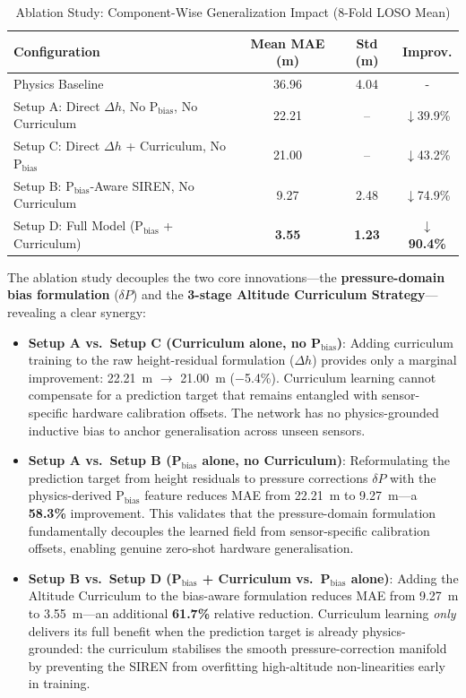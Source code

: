 \begin{table}[htbp]
\caption{Ablation Study: Component-Wise Generalization Impact (8-Fold LOSO Mean)}
\label{tab:ablation}
\centering
\begin{tabular}{lccc}
\toprule
\textbf{Configuration} & \textbf{Mean MAE (m)} & \textbf{Std (m)} & \textbf{Improv.} \\
\midrule
Physics Baseline & 36.96 & 4.04 & - \\
\midrule
Setup A: Direct $\Delta h$, No P$_{\text{bias}}$, No Curriculum & 22.21 & -- & $\downarrow$39.9\% \\
Setup C: Direct $\Delta h$ + Curriculum, No P$_{\text{bias}}$ & 21.00 & -- & $\downarrow$43.2\% \\
Setup B: P$_{\text{bias}}$-Aware SIREN, No Curriculum & 9.27 & 2.48 & $\downarrow$74.9\% \\
\midrule
Setup D: Full Model (P$_{\text{bias}}$ + Curriculum) & \textbf{3.55} & \textbf{1.23} & $\boldsymbol{\downarrow}$\textbf{90.4\%} \\
\bottomrule
\end{tabular}
\end{table}

The ablation study decouples the two core innovations---the \textbf{pressure-domain bias formulation} ($\delta P$) and the \textbf{3-stage Altitude Curriculum Strategy}---revealing a clear synergy:

\begin{itemize}
    \item \textbf{Setup A vs.\ Setup C (Curriculum alone, no P$_{\text{bias}}$)}: Adding curriculum training to the raw height-residual formulation ($\Delta h$) provides only a marginal improvement: 22.21~m $\rightarrow$ 21.00~m ($-$5.4\%). Curriculum learning cannot compensate for a prediction target that remains entangled with sensor-specific hardware calibration offsets. The network has no physics-grounded inductive bias to anchor generalisation across unseen sensors.

    \item \textbf{Setup A vs.\ Setup B (P$_{\text{bias}}$ alone, no Curriculum)}: Reformulating the prediction target from height residuals to pressure corrections $\delta P$ with the physics-derived P$_{\text{bias}}$ feature reduces MAE from 22.21~m to 9.27~m---a \textbf{58.3\%} improvement. This validates that the pressure-domain formulation fundamentally decouples the learned field from sensor-specific calibration offsets, enabling genuine zero-shot hardware generalisation.

    \item \textbf{Setup B vs.\ Setup D (P$_{\text{bias}}$ + Curriculum vs.\ P$_{\text{bias}}$ alone)}: Adding the Altitude Curriculum to the bias-aware formulation reduces MAE from 9.27~m to 3.55~m---an additional \textbf{61.7\%} relative reduction. Curriculum learning \emph{only} delivers its full benefit when the prediction target is already physics-grounded: the curriculum stabilises the smooth pressure-correction manifold by preventing the SIREN from overfitting high-altitude non-linearities early in training.
\end{itemize}

